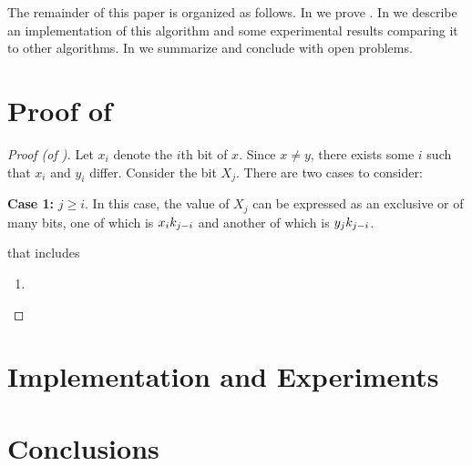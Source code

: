 \documentclass[lotsofwhite,charterfonts]{patmorin}
\begin{document}
The remainder of this paper is organized as follows.   In
 we prove .  In 
we describe an implementation of this algorithm and some experimental
results comparing it to other algorithms.  In  we
summarize and conclude with open problems.

\section{Proof of }

\begin{proof}[Proof (of )]

Let $x_i$ denote the $i$th bit of $x$.  Since $x\neq y$, there exists
some $i$ such that $x_i$ and $y_i$ differ.  Consider the bit $X_j$.
There are two cases to consider:

\noindent\textbf{Case 1:} $j \ge i$.  In this case, the value of $X_j$
can be expressed as an exclusive or of many bits, one of which is
$x_i\relax k_{j-i}$ and another of which is $y_j\relax k_{j-i}$. 

 that includes
\begin{enumerate}
\item

\end{enumerate}


\end{proof}

\section{Implementation and Experiments}

\section{Conclusions}
\end{document}
